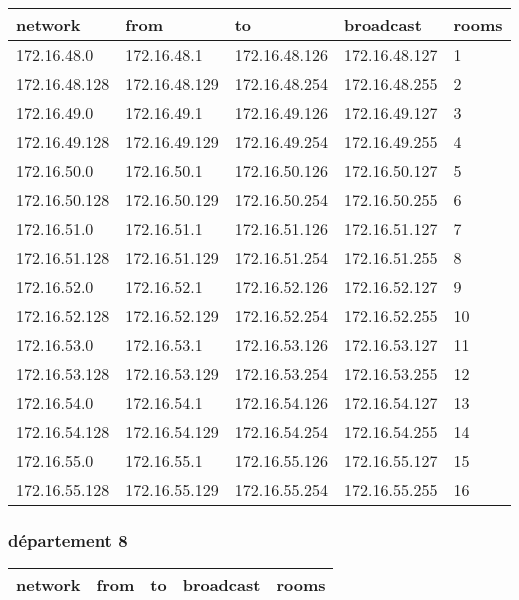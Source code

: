 \documentclass[11pt]{article}
\begin{document}
\begin{center}
\begin{tabular}{|l|l|l|l|l|}
\hline
network & from & to & broadcast & rooms \\
\hline
172.16.48.0 & 172.16.48.1 & 172.16.48.126 & 172.16.48.127 & 1 \\
\hline
172.16.48.128 & 172.16.48.129 & 172.16.48.254 & 172.16.48.255 & 2 \\
\hline
172.16.49.0 & 172.16.49.1 & 172.16.49.126 & 172.16.49.127 & 3 \\
\hline
172.16.49.128 & 172.16.49.129 & 172.16.49.254 & 172.16.49.255 & 4 \\
\hline
172.16.50.0 & 172.16.50.1 & 172.16.50.126 & 172.16.50.127 & 5 \\
\hline
172.16.50.128 & 172.16.50.129 & 172.16.50.254 & 172.16.50.255 & 6 \\
\hline
172.16.51.0 & 172.16.51.1 & 172.16.51.126 & 172.16.51.127 & 7 \\
\hline
172.16.51.128 & 172.16.51.129 & 172.16.51.254 & 172.16.51.255 & 8 \\
\hline
172.16.52.0 & 172.16.52.1 & 172.16.52.126 & 172.16.52.127 & 9 \\
\hline
172.16.52.128 & 172.16.52.129 & 172.16.52.254 & 172.16.52.255 & 10 \\
\hline
172.16.53.0 & 172.16.53.1 & 172.16.53.126 & 172.16.53.127 & 11 \\
\hline
172.16.53.128 & 172.16.53.129 & 172.16.53.254 & 172.16.53.255 & 12 \\
\hline
172.16.54.0 & 172.16.54.1 & 172.16.54.126 & 172.16.54.127 & 13 \\
\hline
172.16.54.128 & 172.16.54.129 & 172.16.54.254 & 172.16.54.255 & 14 \\
\hline
172.16.55.0 & 172.16.55.1 & 172.16.55.126 & 172.16.55.127 & 15 \\
\hline
172.16.55.128 & 172.16.55.129 & 172.16.55.254 & 172.16.55.255 & 16 \\
\hline
\end{tabular}
\end{center}

\subsubsection{département 8}
\label{sec:orgheadline12}

\begin{center}
\begin{tabular}{|l|l|l|l|l|}
\hline
network & from & to & broadcast & rooms \\
\hline
\end{tabular}
\end{center}
\end{document}
